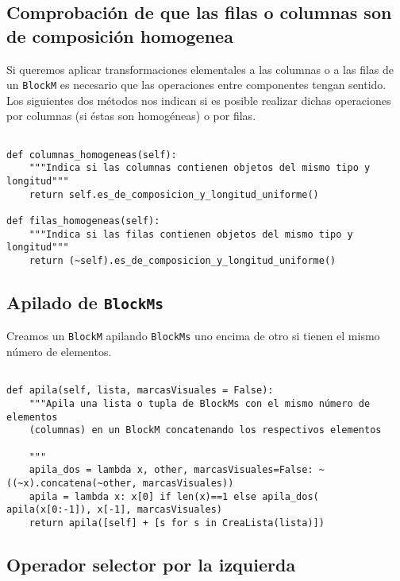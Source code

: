 \documentclass[11pt]{report}
\begin{document}
\subsection{Comprobación de que las filas o columnas son de composición homogenea}
\label{sec:org34be8cd}

Si queremos aplicar transformaciones elementales a las columnas o a
las filas de un \texttt{BlockM} es necesario que las operaciones entre
componentes tengan sentido. Los siguientes dos métodos nos indican si
es posible realizar dichas operaciones por columnas (si éstas son
homogéneas) o por filas.
\begin{verbatim}

def columnas_homogeneas(self):
    """Indica si las columnas contienen objetos del mismo tipo y longitud"""
    return self.es_de_composicion_y_longitud_uniforme()

def filas_homogeneas(self):
    """Indica si las filas contienen objetos del mismo tipo y longitud"""
    return (~self).es_de_composicion_y_longitud_uniforme()

\end{verbatim}

\subsection{Apilado de \texttt{BlockMs}}
\label{sec:org101ec93}

Creamos un \texttt{BlockM} apilando \texttt{BlockMs} uno encima de otro si tienen el
mismo número de elementos.
\begin{verbatim}

def apila(self, lista, marcasVisuales = False):
    """Apila una lista o tupla de BlockMs con el mismo número de elementos
    (columnas) en un BlockM concatenando los respectivos elementos

    """
    apila_dos = lambda x, other, marcasVisuales=False: ~((~x).concatena(~other, marcasVisuales))
    apila = lambda x: x[0] if len(x)==1 else apila_dos( apila(x[0:-1]), x[-1], marcasVisuales)
    return apila([self] + [s for s in CreaLista(lista)])

\end{verbatim}

\subsection{Operador selector por la izquierda}
\label{sec:org85e52fa}
\end{document}
